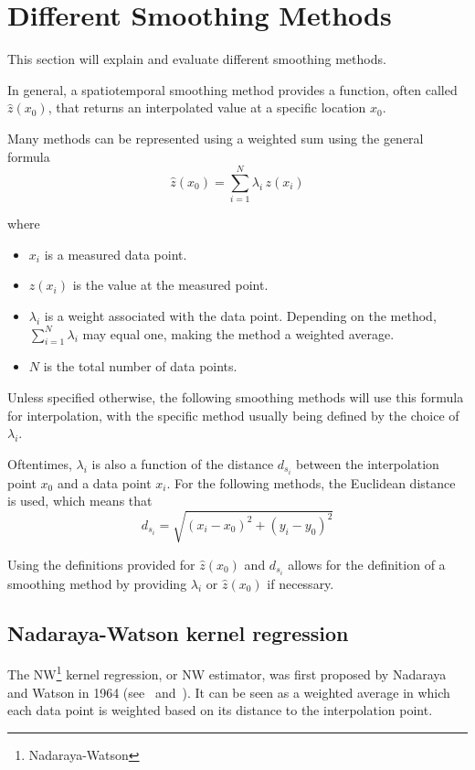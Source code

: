 \section{Different Smoothing Methods}\label{sec:smoothingmethods}
This section will explain and evaluate different smoothing methods.

In general, a spatiotemporal smoothing method provides a function, often called $\hat{z}(x_0)$, that returns an interpolated value at a specific location $x_0$.

Many methods can be represented using a weighted sum using the general formula
\[
\hat{z}(x_0)=\sum_{i=1}^N \lambda_i \, z(x_i)
\]

where
\begin{itemize}
    \item $x_i$ is a measured data point.
    \item $z(x_i)$ is the value at the measured point.
    \item $\lambda_i$ is a weight associated with the data point. Depending on the method, $\sum_{i=1}^N \lambda_i$ may equal one, making the method a weighted average.
    \item $N$ is the total number of data points.
\end{itemize}

Unless specified otherwise, the following smoothing methods will use this formula for interpolation, with the specific method usually being defined by the choice of $\lambda_i$.

Oftentimes, $\lambda_i$ is also a function of the distance $d_{s_i}$ between the interpolation point $x_0$ and a data point $x_i$. For the following methods, the Euclidean distance is used, which means that
\[
d_{s_i}=\sqrt{{(x_i-x_0)}^2+{(y_i-y_0)}^2}
\]

Using the definitions provided for $\hat{z}(x_0)$ and $d_{s_i}$ allows for the definition of a smoothing method by providing $\lambda_i$ or $\hat{z}(x_0)$ if necessary.

\subsection{Nadaraya-Watson kernel regression}\label{subsec:nw_regression}

The NW\footnote{Nadaraya-Watson} kernel regression, or NW estimator, was first proposed by Nadaraya and Watson in 1964 (see\ \cite{nw:nadaraya} and\ \cite{nw:watson}). It can be seen as a weighted average in which each data point is weighted based on its distance to the interpolation point.

